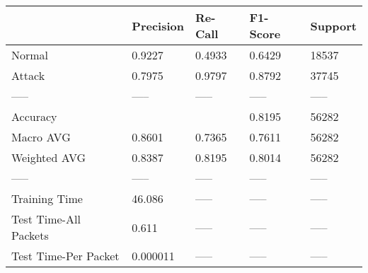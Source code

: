 \begin{tabular}{lllll}
\toprule
{} & Precision & Re-Call & F1-Score & Support \\
\midrule
Normal                &    0.9227 &  0.4933 &   0.6429 &   18537 \\
Attack                &    0.7975 &  0.9797 &   0.8792 &   37745 \\
-----                 &     ----- &   ----- &    ----- &   ----- \\
Accuracy              &           &         &   0.8195 &   56282 \\
Macro AVG             &    0.8601 &  0.7365 &   0.7611 &   56282 \\
Weighted AVG          &    0.8387 &  0.8195 &   0.8014 &   56282 \\
-----                 &     ----- &   ----- &    ----- &   ----- \\
Training Time         &    46.086 &   ----- &    ----- &   ----- \\
Test Time-All Packets &     0.611 &   ----- &    ----- &   ----- \\
Test Time-Per Packet  &  0.000011 &   ----- &    ----- &   ----- \\
\bottomrule
\end{tabular}
